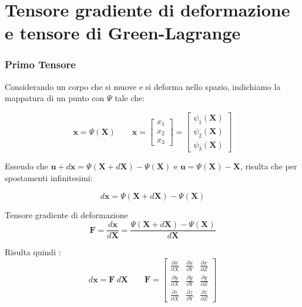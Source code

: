 \section{Tensore gradiente di deformazione e tensore di Green-Lagrange}
\subsubsection*{Primo Tensore}
Considerando un corpo che si muove e si deforma nello spazio, indichiamo la mappatura di un punto con $\Psi$ tale che:

\begin{equation*}
\mathbf{x} =  \Psi(\mathbf{X}) 
\quad \quad 
\mathbf{x} = 
\begin{bmatrix}
x_1 \\
x_2 \\
x_3
\end{bmatrix}
= 
\begin{bmatrix}
\psi_1(\mathbf{X}) \\
\psi_2(\mathbf{X}) \\
\psi_3(\mathbf{X})
\end{bmatrix}
\end{equation*}

Essendo che $\mathbf{u} + d\mathbf{x} = \Psi(\mathbf{X} + d\mathbf{X})-\Psi(\mathbf{X})$ e $\mathbf{u} = \Psi(\mathbf{X})-\mathbf{X} $, risulta che per spostamenti infinitesimi:

\begin{equation*}
d\mathbf{x} = \Psi(\mathbf{X} + d\mathbf{X}) - \Psi(\mathbf{X})
\end{equation*}

\begin{definizioneBox}
Tensore gradiente di deformazione 
\begin{equation*}
\boldsymbol{F} = \frac{d\mathbf{x}}{d\mathbf{X}} = \frac{\Psi(\mathbf{X} + d\mathbf{X}) - \Psi(\mathbf{X})}{d\mathbf{X}}
\end{equation*}
\end{definizioneBox}

Risulta quindi :
\begin{equation*}
d\mathbf{x} = \boldsymbol{F}\ d\mathbf{X} 
\quad \quad  
\boldsymbol{F} = 
\begin{bmatrix}
\frac{\partial x}{\partial X} & \frac{\partial x}{\partial Y} & \frac{\partial x}{\partial Z} \\
\frac{\partial y}{\partial X} & \frac{\partial y}{\partial Y} & \frac{\partial y}{\partial Z} \\
\frac{\partial z}{\partial X} & \frac{\partial z}{\partial Y} & \frac{\partial z}{\partial Z}
\end{bmatrix}
\end{equation*}

